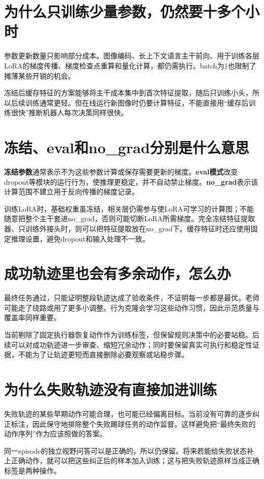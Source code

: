 \section{为什么只训练少量参数，仍然要十多个小时}
参数更新数量只影响部分成本。图像编码、长上下文语言主干前向、用于训练各层LoRA的梯度传播、梯度检查点重算和量化计算，都仍需执行。batch为1也限制了摊薄某些开销的机会。

冻结后缓存特征的方案能够将主干成本集中到首次特征提取，随后只训练小头，所以后续训练通常更轻。但在线运行新图像时仍要计算特征，不能直接用“缓存后训练很快”推断机器人每次决策同样很快。

\section{冻结、eval和no\_grad分别是什么意思}
\textbf{冻结参数}通常表示不为这些参数计算或保存需要更新的梯度。\textbf{eval模式}改变dropout等模块的运行行为，使推理更稳定，并不自动禁止梯度。\textbf{no\_grad}表示该计算范围不建立用于反向传播的梯度记录。

训练LoRA时，基础权重虽冻结，相关层仍需参与使LoRA可学习的计算图；不能随意把整个主干套进no\_grad，否则可能切断LoRA所需梯度。完全冻结特征提取器、只训练外接头时，则可以把特征提取放在no\_grad下。缓存特征时还应使用固定推理设置，避免dropout和输入处理不一致。

\section{成功轨迹里也会有多余动作，怎么办}
最终任务通过，只能证明整段轨迹达成了验收条件，不证明每一步都是最优。老师可能走了绕路或用了更多小调整。行为克隆会学习这些动作习惯，因此示范质量与覆盖率同样重要。

当前剔除了固定执行器恢复动作作为训练标签，但保留规则决策中的必要站稳。后续可以对成功轨迹进一步审查、缩短冗余动作；同时要保留真实可执行和稳定性证据，不能为了让轨迹更短而直接删除必要观察或站稳步骤。

\section{为什么失败轨迹没有直接加进训练}
失败轨迹的某些早期动作可能合理，也可能已经偏离目标。当前没有可靠的逐步纠正标注，因此保守地排除整个失败踢球任务的动作监督。这样避免把“最终失败的动作序列”作为应该照做的答案。

同一episode的独立视野问答可以是正确的，所以仍保留。将来若能给失败状态补上正确动作，就可以把这些纠正后的样本加入训练；这与把失败轨迹原样当成正确标签是两种操作。

